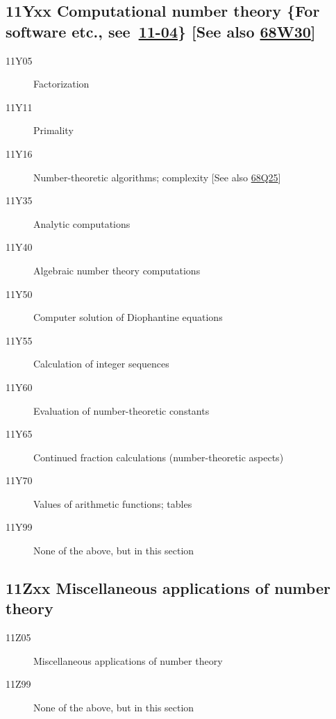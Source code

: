 \documentclass[letterpaper]{article}
\begin{document}
\subsection*{11Yxx  Computational number theory \{For software etc., see~\hyperref[11-04]{11-04}\} [See also \hyperref[68W30]{68W30}]}\label{11Yxx}
\begin{description}  
\item [11Y05]\label{11Y05} Factorization
\item [11Y11]\label{11Y11} Primality
\item [11Y16]\label{11Y16} Number-theoretic algorithms; complexity [See also \hyperref[68Q25]{68Q25}]
\item [11Y35]\label{11Y35} Analytic computations
\item [11Y40]\label{11Y40} Algebraic number theory computations
\item [11Y50]\label{11Y50} Computer solution of Diophantine equations
\item [11Y55]\label{11Y55} Calculation of integer sequences
\item [11Y60]\label{11Y60} Evaluation of number-theoretic constants 
\item [11Y65]\label{11Y65} Continued fraction calculations (number-theoretic aspects)
\item [11Y70]\label{11Y70} Values of arithmetic functions; tables
\item [11Y99]\label{11Y99} None of the above, but in this section
\end{description}
\subsection*{11Zxx  Miscellaneous applications of number theory }\label{11Zxx}
\begin{description}  
\item [11Z05]\label{11Z05} Miscellaneous applications of number theory
\item [11Z99]\label{11Z99} None of the above, but in this section
\end{description}
\end{document}
